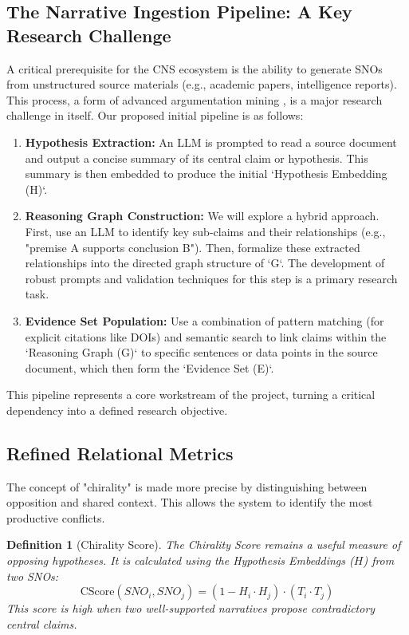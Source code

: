 \documentclass[12pt, a4paper]{article}
\newtheorem{definition}{Definition}[section]
\begin{document}
\subsection{The Narrative Ingestion Pipeline: A Key Research Challenge}
A critical prerequisite for the CNS ecosystem is the ability to generate SNOs from unstructured source materials (e.g., academic papers, intelligence reports). This process, a form of advanced argumentation mining \citet{Lippi2016ArgMining}, is a major research challenge in itself. Our proposed initial pipeline is as follows:
\begin{enumerate}
    \item \textbf{Hypothesis Extraction:} An LLM is prompted to read a source document and output a concise summary of its central claim or hypothesis. This summary is then embedded to produce the initial `Hypothesis Embedding (H)`.
    \item \textbf{Reasoning Graph Construction:} We will explore a hybrid approach. First, use an LLM to identify key sub-claims and their relationships (e.g., "premise A supports conclusion B"). Then, formalize these extracted relationships into the directed graph structure of `G`. The development of robust prompts and validation techniques for this step is a primary research task.
    \item \textbf{Evidence Set Population:} Use a combination of pattern matching (for explicit citations like DOIs) and semantic search to link claims within the `Reasoning Graph (G)` to specific sentences or data points in the source document, which then form the `Evidence Set (E)`.
\end{enumerate}
This pipeline represents a core workstream of the project, turning a critical dependency into a defined research objective.


\subsection{Refined Relational Metrics}
The concept of "chirality" is made more precise by distinguishing between opposition and shared context. This allows the system to identify the most productive conflicts.

\begin{definition}[Chirality Score]
The Chirality Score remains a useful measure of opposing \textit{hypotheses}. It is calculated using the Hypothesis Embeddings ($H$) from two SNOs:
\[
\text{CScore}(SNO_i, SNO_j) = (1 - H_i \cdot H_j) \cdot (T_i \cdot T_j)
\]
This score is high when two well-supported narratives propose contradictory central claims.
\end{definition}
\end{document}
